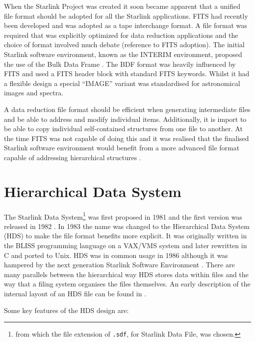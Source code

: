 \documentclass[final,authoryear,5p,times,twocolumn]{elsarticle}
\begin{document}
When the Starlink Project was created it soon became apparent that a
unified file format should be adopted for all the Starlink
applications. FITS \citep{1979ipia.coll..445W,1981A&AS...44..363W} had
recently been developed and was adopted as a tape interchange
format. A file format was required that was explicitly optimized for
data reduction applications and the choice of format involved much
debate (reference to FITS adoption). The initial Starlink software
environment, known as the INTERIM environment, proposed the use of the
Bulk Data Frame \citep[BDF;][]{1980SPIE..264...70P,SUN4}. The BDF format
was heavily influenced by FITS and used a FITS header block with
standard FITS keywords. Whilst it had a flexible design a special
``IMAGE'' variant was standardised for astronomical images and
spectra.

A data reduction file format should be efficient when generating
intermediate files and be able to address and modify individual items.
Additionally, it is import to be able to copy individual
self-contained structures from one file to another. At the time FITS
was not capable of doing this and it was realised that the finalised
Starlink software environment would benefit from a more advanced file
format capable of addressing hierarchical structures
\citep{1981STARENT4}.


\section{Hierarchical Data System}

The Starlink Data System\footnote{from which the file extension of
  \texttt{.sdf}, for Starlink Data File, was chosen.} was first
proposed in 1981 and the first version was released in 1982 \citep[see
e.g.][]{1982QJRAS..23..485D,1991STARB...8....2L}. In 1983 the name was
changed to the Hierarchical Data System (HDS) to make the file format
benefits more explicit. It was originally written in the BLISS
programming language on a VAX/VMS system and later rewritten in C and
ported to Unix.  HDS was in common usage in 1986 although it was
hampered by the next generation Starlink Software Environment
\citep{1986BICDS..30...13L}.  There are many parallels between the
hierarchical way HDS stores data within files and the way that a
filing system organises the files themselves. An early description of
the internal layout of an HDS file can be found in \citet{SSN27a}.

Some key features of the HDS design are:
\end{document}
